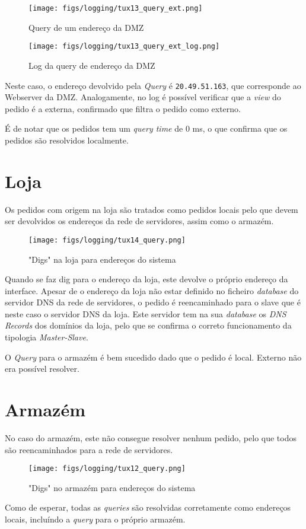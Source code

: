 \begin{figure}[H]
    \centering
    \texttt{[image: figs/logging/tux13\_query\_ext.png]}
    \caption{Query de um endereço da DMZ}
    \label{fig:tux13_query_ext}
\end{figure}

\begin{figure}[H]
    \centering
    \texttt{[image: figs/logging/tux13\_query\_ext\_log.png]}
    \caption{Log da query de endereço da DMZ}
    \label{fig:tux13_query_ext_log}
\end{figure}

Neste caso, o endereço devolvido pela \textit{Query} é \verb|20.49.51.163|, que corresponde ao Webserver da DMZ.
Analogamente, no log é possível verificar que a \textit{view} do pedido é a externa, confirmado que filtra o pedido como externo.

É de notar que os pedidos tem um \textit{query time} de 0 ms, o que confirma que os pedidos são resolvidos localmente.

\clearpage 
\section{Loja} \label{loja_dns}

Os pedidos com origem na loja são tratados como pedidos locais pelo que devem ser devolvidos os endereços da rede de servidores, assim como o armazém.

\begin{figure}[H]
    \centering
    \texttt{[image: figs/logging/tux14\_query.png]}
    \caption{"Digs" na loja para endereços do sistema}
    \label{fig:tux14_query}
\end{figure}

Quando se faz dig para o endereço da loja, este devolve o próprio endereço da interface.
Apesar de o endereço da loja não estar definido no ficheiro \textit{database} do servidor DNS da rede de servidores,
o pedido é reencaminhado para o slave que é neste caso o servidor DNS da loja.
Este servidor tem na sua \textit{database} os \textit{DNS Records} dos domínios da loja, pelo que se confirma o correto funcionamento da tipologia \textit{Master-Slave}.

O \textit{Query} para o armazém é bem sucedido dado que o pedido é local. Externo não era possível resolver.

\section{Armazém} \label{arm_dns}

No caso do armazém, este não consegue resolver nenhum pedido, pelo que todos são reencaminhados para a rede de servidores.

\begin{figure}[H]
    \centering
    \texttt{[image: figs/logging/tux12\_query.png]}
    \caption{"Digs" no armazém para endereços do sistema}
    \label{fig:tux12_query}
\end{figure}

Como de esperar, todas as \textit{queries} são resolvidas corretamente como endereços locais, incluíndo a \textit{query} para o próprio armazém.
